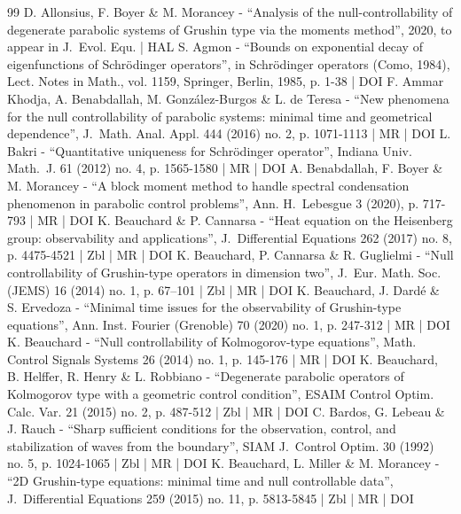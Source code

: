 \documentclass[10pt]{amsart}
\theoremstyle{plain}
\theoremstyle{definition}
\newcommand{\1}{\mathds 1}
\begin{document}
\begin{thebibliography}{99}
D. Allonsius, F. Boyer \& M. Morancey - “Analysis of the null-controllability of degenerate parabolic systems of Grushin type via the moments method”, 2020, to appear in J. Evol. Equ. | HAL
S. Agmon - “Bounds on exponential decay of eigenfunctions of Schrödinger operators”, in Schrödinger operators (Como, 1984), Lect. Notes in Math., vol. 1159, Springer, Berlin, 1985, p. 1-38 | DOI
F. Ammar Khodja, A. Benabdallah, M. González-Burgos \& L. de Teresa - “New phenomena for the null controllability of parabolic systems: minimal time and geometrical dependence”, J. Math. Anal. Appl. 444 (2016) no. 2, p. 1071-1113 | MR | DOI
L. Bakri - “Quantitative uniqueness for Schrödinger operator”, Indiana Univ. Math. J. 61 (2012) no. 4, p. 1565-1580 | MR | DOI
A. Benabdallah, F. Boyer \& M. Morancey - “A block moment method to handle spectral condensation phenomenon in parabolic control problems”, Ann. H. Lebesgue 3 (2020), p. 717-793 | MR | DOI
K. Beauchard \& P. Cannarsa - “Heat equation on the Heisenberg group: observability and applications”, J. Differential Equations 262 (2017) no. 8, p. 4475-4521 | Zbl | MR | DOI
K. Beauchard, P. Cannarsa \& R. Guglielmi - “Null controllability of Grushin-type operators in dimension two”, J. Eur. Math. Soc. (JEMS) 16 (2014) no. 1, p. 67–101 | Zbl | MR | DOI
K. Beauchard, J. Dardé \& S. Ervedoza - “Minimal time issues for the observability of Grushin-type equations”, Ann. Inst. Fourier (Grenoble) 70 (2020) no. 1, p. 247-312 | MR | DOI
K. Beauchard - “Null controllability of Kolmogorov-type equations”, Math. Control Signals Systems 26 (2014) no. 1, p. 145-176 | MR | DOI
K. Beauchard, B. Helffer, R. Henry \& L. Robbiano - “Degenerate parabolic operators of Kolmogorov type with a geometric control condition”, ESAIM Control Optim. Calc. Var. 21 (2015) no. 2, p. 487-512 | Zbl | MR | DOI
C. Bardos, G. Lebeau \& J. Rauch - “Sharp sufficient conditions for the observation, control, and stabilization of waves from the boundary”, SIAM J. Control Optim. 30 (1992) no. 5, p. 1024-1065 | Zbl | MR | DOI
K. Beauchard, L. Miller \& M. Morancey - “2D Grushin-type equations: minimal time and null controllable data”, J. Differential Equations 259 (2015) no. 11, p. 5813-5845 | Zbl | MR | DOI

\end{thebibliography}
\end{document}
